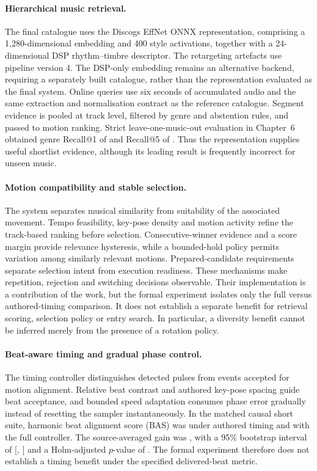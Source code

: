 \paragraph{Hierarchical music retrieval.}
The final catalogue uses the Discogs EffNet ONNX representation, comprising a
1,280-dimensional embedding and 400 style activations, together with a
24-dimensional DSP rhythm--timbre descriptor. The retargeting artefacts use
pipeline version 4. The DSP-only embedding remains an alternative backend,
requiring a separately built catalogue, rather than the representation evaluated
as the final system. Online queries use six seconds of accumulated audio and
the same extraction and normalisation contract as the reference catalogue.
Segment evidence is pooled at track level, filtered by genre and abstention
rules, and passed to motion ranking. Strict leave-one-music-out evaluation in
Chapter~6 obtained genre Recall@1 of \ChSixRecallOne{} and Recall@5 of
\ChSixRecallFive{}. Thus the
representation supplies useful shortlist evidence, although its leading result
is frequently incorrect for unseen music.

\paragraph{Motion compatibility and stable selection.}
The system separates musical similarity from suitability of the associated
movement. Tempo feasibility, key-pose density and motion activity refine the
track-based ranking before selection. Consecutive-winner evidence and a score
margin provide relevance hysteresis, while a bounded-hold policy permits
variation among similarly relevant motions. Prepared-candidate requirements
separate selection intent from execution readiness. These mechanisms make
repetition, rejection and switching decisions observable. Their implementation
is a contribution of the work, but the formal experiment isolates only the
full versus authored-timing comparison. It does not establish a separate
benefit for retrieval scoring, selection policy or entry search. In particular, a diversity benefit cannot be inferred merely from
the presence of a rotation policy.

\paragraph{Beat-aware timing and gradual phase control.}
The timing controller distinguishes detected pulses from events accepted for
motion alignment. Relative beat contrast and authored key-pose spacing guide
beat acceptance, and bounded speed adaptation consumes phase error gradually
instead of resetting the sampler instantaneously. In the matched causal short
suite, harmonic beat alignment score (BAS) was \ChSixAuthoredBas{} under
authored timing and \ChSixFullBas{} with the full controller. The
source-averaged gain was \ChSixBasGain{}, with a
95\% bootstrap interval of [\ChSixBasGainLow{}, \ChSixBasGainHigh{}] and a
Holm-adjusted $p$-value of
\ChSixBasHolm{}. The formal experiment therefore does not establish a timing benefit
under the specified delivered-beat metric.

